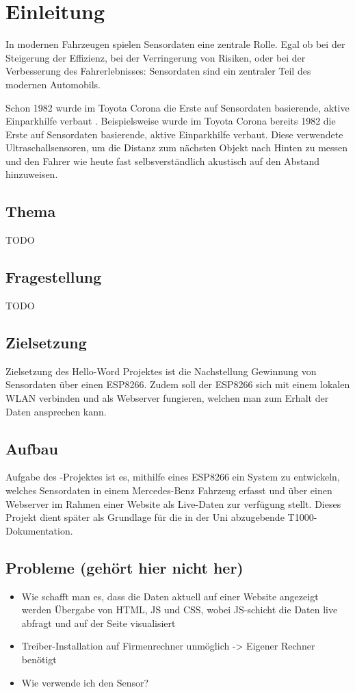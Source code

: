 
\chapter{Einleitung}
In modernen Fahrzeugen spielen Sensordaten eine zentrale Rolle. Egal ob bei der Steigerung der Effizienz, bei der Verringerung von Risiken, oder bei der Verbesserung des Fahrerlebnisses: Sensordaten sind ein zentraler Teil des modernen Automobils.  


Schon 1982 wurde im Toyota Corona die Erste auf Sensordaten basierende, aktive Einparkhilfe verbaut \protect{}. 
Beispielsweise wurde im Toyota Corona bereits 1982 die Erste auf Sensordaten basierende, aktive Einparkhilfe verbaut. Diese verwendete Ultraschallsensoren, um die Distanz zum nächsten Objekt nach Hinten zu messen und den Fahrer wie heute fast selbsverständlich akustisch auf den Abstand hinzuweisen.



\section{Thema}
TODO

\section{Fragestellung}
TODO

\section{Zielsetzung}
Zielsetzung des Hello-Word Projektes ist die Nachstellung Gewinnung von Sensordaten über einen ESP8266. Zudem soll der ESP8266 sich mit einem lokalen WLAN verbinden und als Webserver fungieren, welchen man zum Erhalt der Daten ansprechen kann.

\section{Aufbau}
Aufgabe des {\arbeit}-Projektes ist es, mithilfe eines ESP8266 ein System zu entwickeln, welches Sensordaten in einem Mercedes-Benz Fahrzeug erfasst und über einen Webserver im Rahmen einer Website als Live-Daten zur verfügung stellt. Dieses Projekt dient später als Grundlage für die in der Uni abzugebende T1000-Dokumentation.

\section{Probleme (gehört hier nicht her)}
\begin{itemize}
	\item Wie schafft man es, dass die Daten aktuell auf einer Website angezeigt werden
	\subitem Übergabe von HTML, JS und CSS, wobei JS-schicht die Daten live abfragt und auf der Seite visualisiert
    \item Treiber-Installation auf Firmenrechner unmöglich -> Eigener Rechner benötigt
    \item Wie verwende ich den Sensor?
\end{itemize}